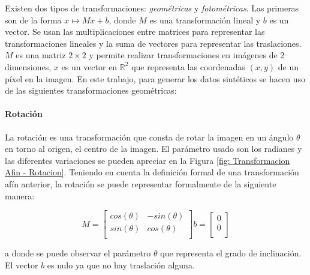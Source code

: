 			Existen dos tipos de transformaciones: \textit{geométricas} y \textit{fotométricas}. Las primeras son de la forma $x\mapsto Mx + b$, donde $M$ es una transformación lineal y $b$ es un vector. Se usan las multiplicaciones entre matrices para representar las transformaciones lineales y la suma de vectores para representar las traslaciones. $M$ es una matriz $2\times 2$ y permite realizar transformaciones en imágenes de 2 dimensiones, $x$ es un vector en $\mathbb{R}^2$ que representa las coordenadas $(x,y)$ de un píxel en la imagen. En este trabajo, para generar los datos sintéticos se hacen uso de las siguientes transformaciones geométricas:
			
			\paragraph{Rotación}
			
				La rotación es una transformación que consta de rotar la imagen en un ángulo $\theta$ en torno al origen, el centro de la imagen. El parámetro usado son los radianes y las diferentes variaciones se pueden apreciar en la Figura \ref{fig: Transformacion Afin - Rotacion}. Teniendo en cuenta la definición formal de una transformación afín anterior, la rotación se puede representar formalmente de la siguiente manera:

			\begin{equation*}
					M =  
					\begin{bmatrix}
						cos(\theta) & -sin(\theta) \\
						sin(\theta) & cos(\theta)  \\
					\end{bmatrix}
					b =
					\begin{bmatrix}
						0 \\
						0 \\
					\end{bmatrix}	
			\end{equation*}

	a donde se puede observar el parámetro $\theta$ que representa el grado de inclinación. El vector $b$ es nulo ya que no hay traslación alguna.

